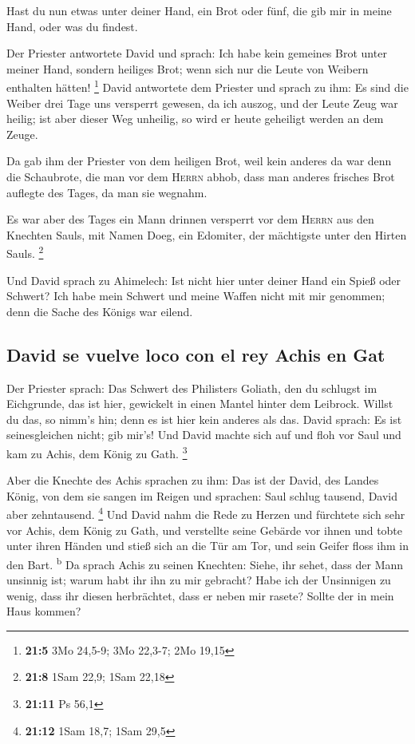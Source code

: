  Hast du nun etwas unter deiner Hand, ein Brot oder fünf,
die gib mir in meine Hand, oder was du findest.

 Der Priester antwortete David und sprach: Ich habe kein
gemeines Brot unter meiner Hand, sondern heiliges Brot; wenn sich nur
die Leute von Weibern enthalten hätten! \footnote{\textbf{21:5} 3Mo
  24,5-9; 3Mo 22,3-7; 2Mo 19,15}  David antwortete dem
Priester und sprach zu ihm: Es sind die Weiber drei Tage uns versperrt
gewesen, da ich auszog, und der Leute Zeug war heilig; ist aber dieser
Weg unheilig, so wird er heute geheiligt werden an dem Zeuge.

 Da gab ihm der Priester von dem heiligen Brot, weil kein
anderes da war denn die Schaubrote, die man vor dem \textsc{Herrn}
abhob, dass man anderes frisches Brot auflegte des Tages, da man sie
wegnahm.

 Es war aber des Tages ein Mann drinnen versperrt vor dem
\textsc{Herrn} aus den Knechten Sauls, mit Namen Doeg, ein Edomiter, der
mächtigste unter den Hirten Sauls. \footnote{\textbf{21:8} 1Sam 22,9;
  1Sam 22,18}

 Und David sprach zu Ahimelech: Ist nicht hier unter
deiner Hand ein Spieß oder Schwert? Ich habe mein Schwert und meine
Waffen nicht mit mir genommen; denn die Sache des Königs war eilend.

\hypertarget{david-se-vuelve-loco-con-el-rey-achis-en-gat}{%
\subsection{David se vuelve loco con el rey Achis en
Gat}\label{david-se-vuelve-loco-con-el-rey-achis-en-gat}}

 Der Priester sprach: Das Schwert des Philisters Goliath,
den du schlugst im Eichgrunde, das ist hier, gewickelt in einen Mantel
hinter dem Leibrock. Willst du das, so nimm's hin; denn es ist hier kein
anderes als das. David sprach: Es ist seinesgleichen nicht; gib mir's!
 Und David machte sich auf und floh vor Saul und kam zu
Achis, dem König zu Gath. \footnote{\textbf{21:11} Ps 56,1}

 Aber die Knechte des Achis sprachen zu ihm: Das ist der
David, des Landes König, von dem sie sangen im Reigen und sprachen: Saul
schlug tausend, David aber zehntausend. \footnote{\textbf{21:12} 1Sam
  18,7; 1Sam 29,5}  Und David nahm die Rede zu Herzen und
fürchtete sich sehr vor Achis, dem König zu Gath,  und
verstellte seine Gebärde vor ihnen und tobte unter ihren Händen und
stieß sich an die Tür am Tor, und sein Geifer floss ihm in den Bart.
\textsuperscript{b}  Da sprach Achis zu seinen Knechten:
Siehe, ihr sehet, dass der Mann unsinnig ist; warum habt ihr ihn zu mir
gebracht?  Habe ich der Unsinnigen zu wenig, dass ihr
diesen herbrächtet, dass er neben mir rasete? Sollte der in mein Haus
kommen?

